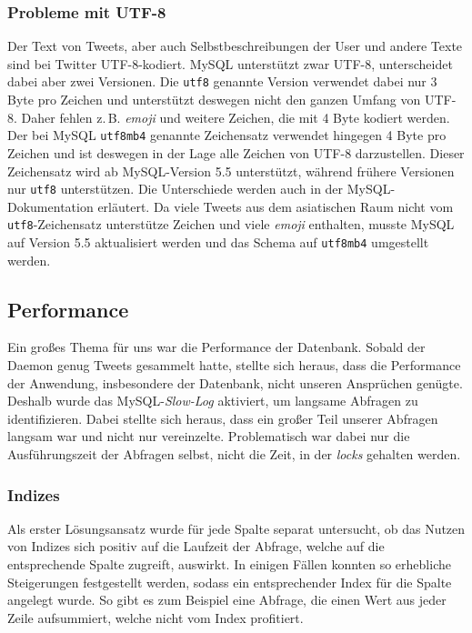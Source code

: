 \subsubsection{Probleme mit UTF-8}
Der Text von Tweets, aber auch Selbstbeschreibungen der User und andere Texte sind bei Twitter UTF-8-kodiert.
MySQL unterstützt zwar UTF-8, unterscheidet dabei aber zwei Versionen.
Die \texttt{utf8} genannte Version verwendet dabei nur 3 Byte pro Zeichen und unterstützt deswegen nicht den ganzen Umfang von UTF-8. Daher fehlen z.\,B. \textit{emoji} und weitere Zeichen, die mit 4 Byte kodiert werden.
Der bei MySQL \texttt{utf8mb4} genannte Zeichensatz verwendet hingegen 4 Byte pro Zeichen und ist deswegen in der Lage alle Zeichen von UTF-8 darzustellen.
Dieser Zeichensatz wird ab MySQL-Version 5.5 unterstützt, während frühere Versionen nur \texttt{utf8} unterstützen. Die Unterschiede werden auch in der MySQL-Dokumentation \cite{MySQLutf8} erläutert.
Da viele Tweets aus dem asiatischen Raum nicht vom \texttt{utf8}-Zeichensatz unterstütze Zeichen und viele \textit{emoji} enthalten, musste MySQL auf Version 5.5 aktualisiert werden und das Schema auf \texttt{utf8mb4} umgestellt werden.

\subsection{Performance}
\label{ssec:Performance}
Ein großes Thema für uns war die Performance der Datenbank.
Sobald der Daemon genug Tweets gesammelt hatte, stellte sich heraus, dass die Performance der Anwendung, insbesondere der Datenbank, nicht unseren Ansprüchen genügte.
Deshalb wurde das MySQL-\textit{Slow-Log} aktiviert, um langsame Abfragen zu identifizieren.
Dabei stellte sich heraus, dass ein großer Teil unserer Abfragen langsam war und nicht nur vereinzelte.
Problematisch war dabei nur die Ausführungszeit der Abfragen selbst, nicht die Zeit, in der \textit{locks} gehalten werden.

\subsubsection{Indizes}
Als erster Lösungsansatz wurde für jede Spalte separat untersucht, ob das Nutzen von Indizes sich positiv auf die Laufzeit der Abfrage, welche auf die entsprechende Spalte zugreift, auswirkt.
In einigen Fällen konnten so erhebliche Steigerungen festgestellt werden, sodass ein entsprechender Index für die Spalte angelegt wurde.
So gibt es zum Beispiel eine Abfrage, die einen Wert aus jeder Zeile aufsummiert, welche nicht vom Index profitiert.

